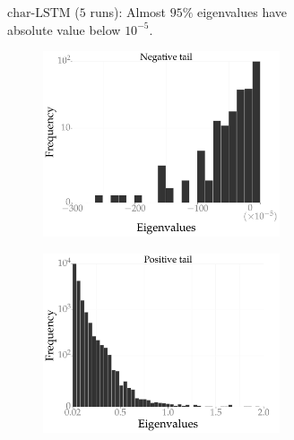 \documentclass[10pt]{article}
\newcommand{\charlstm}{\textrm{char-LSTM}}
\begin{document}
\begin{figure}[!tbh]
\begin{subfigure}[t]{0.44 \textwidth}
        \caption{\small $\charlstm$ ($5$ runs): Almost $95\%$ eigenvalues have absolute value below $10^{-5}$.}
        \label{fig:charlstm_hessian}
    \end{subfigure}
    \begin{subfigure}[b]{\textwidth}
        \centering
        \begin{subfigure}[b]{0.44 \textwidth}
        \includegraphics[width=\textwidth]{allcnn_dm.pdf}
        \end{subfigure}
        \hspace{0.2in}
        \begin{subfigure}[b]{0.44 \textwidth}
        \includegraphics[width=\textwidth]{allcnn_dp.pdf}

\end{subfigure}
\end{subfigure}
\end{figure}
\end{document}
